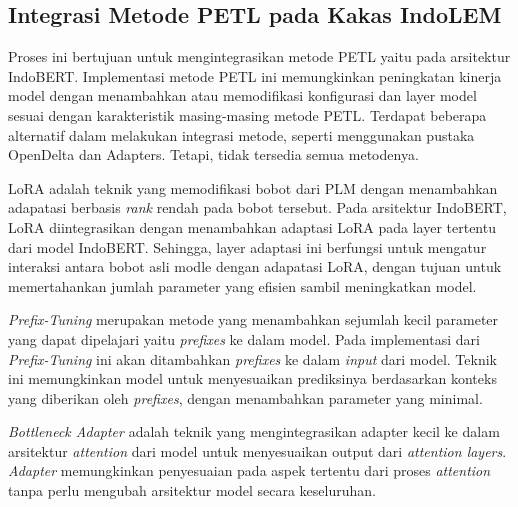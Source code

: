 \subsection{Integrasi Metode PETL pada Kakas IndoLEM}

Proses ini bertujuan untuk mengintegrasikan metode PETL yaitu \methodPETL pada arsitektur IndoBERT. Implementasi metode PETL ini memungkinkan peningkatan kinerja model dengan menambahkan atau memodifikasi konfigurasi dan layer model sesuai dengan karakteristik masing-masing metode PETL. Terdapat beberapa alternatif dalam melakukan integrasi metode, seperti menggunakan pustaka OpenDelta dan Adapters. Tetapi, tidak tersedia semua metodenya.

LoRA adalah teknik yang memodifikasi bobot dari PLM  dengan menambahkan adapatasi berbasis \textit{rank} rendah pada bobot tersebut. Pada arsitektur IndoBERT, LoRA diintegrasikan dengan menambahkan adaptasi LoRA pada layer tertentu dari model IndoBERT. Sehingga, layer adaptasi ini berfungsi untuk mengatur interaksi antara bobot asli modle dengan adapatasi LoRA, dengan tujuan untuk memertahankan jumlah parameter yang efisien sambil meningkatkan model.

\textit{Prefix-Tuning} merupakan metode yang menambahkan sejumlah kecil parameter yang dapat dipelajari yaitu \textit{prefixes} ke dalam model. Pada implementasi dari \textit{Prefix-Tuning} ini akan ditambahkan \textit{prefixes} ke dalam \textit{input} dari model. Teknik ini memungkinkan model untuk menyesuaikan prediksinya berdasarkan konteks yang diberikan oleh \textit{prefixes}, dengan menambahkan parameter yang minimal. 

\textit{Bottleneck Adapter} adalah teknik yang mengintegrasikan adapter kecil ke dalam arsitektur \textit{attention} dari model untuk menyesuaikan output dari \textit{attention layers}. \textit{Adapter} memungkinkan penyesuaian pada aspek tertentu dari proses \textit{attention} tanpa perlu mengubah arsitektur model secara keseluruhan.

